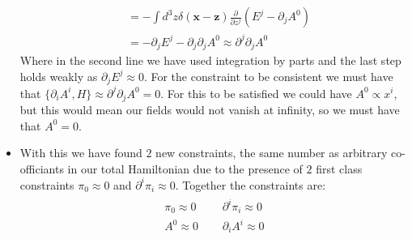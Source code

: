 \documentclass[11pt]{article}
\numberwithin{equation}{section}
\begin{document}
\begin{itemize}
\begin{align*}
      & = -\int d^3z\delta(\textbf{x}-\textbf{z})\frac{\partial}{\partial z^j}\left(E^j - \partial_jA^0\right) \\
      & = -\partial_jE^j - \partial_j\partial_jA^0 \approx  \partial^j\partial_jA^0 
    \end{align*}
    Where in the second line we have used integration by parts and the last step holds weakly as $\partial_jE^j \approx 0$. For the constraint to be consistent we must have that $\{\partial_iA^i,H\} \approx \partial^j\partial_jA^0 = 0$. For this to be satisfied we could have $A^0 \propto x^i$, but this would mean our fields would not vanish at infinity, so we must have that $A^0 =0$. 

    \item With this we have found $2$ new constraints, the same number as arbitrary co-officiants in our total Hamiltonian due to the presence of $2$ first class constraints $\pi_0\approx 0$ and $\partial^i\pi_i \approx 0$. Together the constraints are:
    \begin{align}  
    \label{constraints_gauge}
        \begin{split}
          \pi_0 \approx 0 ~~& ~~~~\partial^i\pi_i \approx 0  \\
        A^0 \approx 0 ~~& ~~~~ \partial_iA^i \approx 0
        \end{split}
      \end{align}
\end{itemize}
\end{document}
